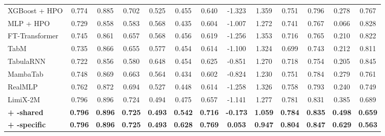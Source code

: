 \begin{table}[H]
\begin{table}[H]
\begin{tabular}{@{}l*{12}{c}@{}}
    XGBoost + HPO & 0.774 & 0.885 & 0.702 & 0.525 & 0.455 & 0.640 & -1.323 & 1.359 & 0.751 & 0.796 & 0.278 & 0.767 \\
    MLP + HPO & 0.729 & 0.858 & 0.583 & 0.568 & 0.435 & 0.604 & -1.007 & 1.272 & 0.741 & 0.767 & 0.066 & 0.828 \\
    FT-Transformer & 0.745 & 0.861 & 0.657 & 0.568 & 0.456 & 0.619 & -1.256 & 1.353 & 0.716 & 0.765 & 0.210 & 0.822 \\
    TabM & 0.735 & 0.866 & 0.655 & 0.577 & 0.454 & 0.614 & -1.100 & 1.324 & 0.699 & 0.743 & 0.212 & 0.811 \\
    TabulaRNN & 0.722 & 0.856 & 0.580 & 0.648 & 0.454 & 0.625 & -0.851 & 1.270 & 0.718 & 0.754 & 0.205 & 0.845 \\
    MambaTab & 0.748 & 0.869 & 0.663 & 0.564 & 0.434 & 0.602 & -0.824 & 1.230 & 0.751 & 0.784 & 0.279 & 0.761 \\
    RealMLP & 0.762 & 0.872 & 0.694 & 0.527 & 0.448 & 0.614 & -1.258 & 1.326 & 0.758 & 0.793 & 0.240 & 0.749 \\
    \midrule
    LimiX-2M & 0.796 & 0.896 & 0.724 & 0.494 & 0.475 & 0.657 & -1.141 & 1.277 & 0.781 & 0.831 & 0.385 & 0.689 \\
    \rowcolor{tabaceSharedRow}
    \textcolor{tabaceSharedText}{\textbf{+ \method{}-shared}} & \textcolor{tabaceSharedText}{\textbf{0.796}} & \textcolor{tabaceSharedText}{\textbf{0.896}} & \textcolor{tabaceSharedText}{\textbf{0.725}} & \textcolor{tabaceSharedText}{\textbf{0.493}} & \textcolor{tabaceSharedText}{\textbf{0.542}} & \textcolor{tabaceSharedText}{\textbf{0.716}} & \textcolor{tabaceSharedText}{\textbf{-0.173}} & \textcolor{tabaceSharedText}{\textbf{1.059}} & \textcolor{tabaceSharedText}{\textbf{0.784}} & \textcolor{tabaceSharedText}{\textbf{0.835}} & \textcolor{tabaceSharedText}{\textbf{0.498}} & \textcolor{tabaceSharedText}{\textbf{0.659}} \\
    \rowcolor{tabaceSpecificRow}
    \textcolor{tabaceSpecificText}{\textbf{+ \method{}-specific}} & \textcolor{tabaceSpecificText}{\textbf{0.796}} & \textcolor{tabaceSpecificText}{\textbf{0.896}} & \textcolor{tabaceSpecificText}{\textbf{0.725}} & \textcolor{tabaceSpecificText}{\textbf{0.493}} & \textcolor{tabaceSpecificText}{\textbf{0.628}} & \textcolor{tabaceSpecificText}{\textbf{0.769}} & \textcolor{tabaceSpecificText}{\textbf{0.053}} & \textcolor{tabaceSpecificText}{\textbf{0.947}} & \textcolor{tabaceSpecificText}{\textbf{0.804}} & \textcolor{tabaceSpecificText}{\textbf{0.847}} & \textcolor{tabaceSpecificText}{\textbf{0.629}} & \textcolor{tabaceSpecificText}{\textbf{0.563}} \\

\end{tabular}
\end{table}
\end{table}
